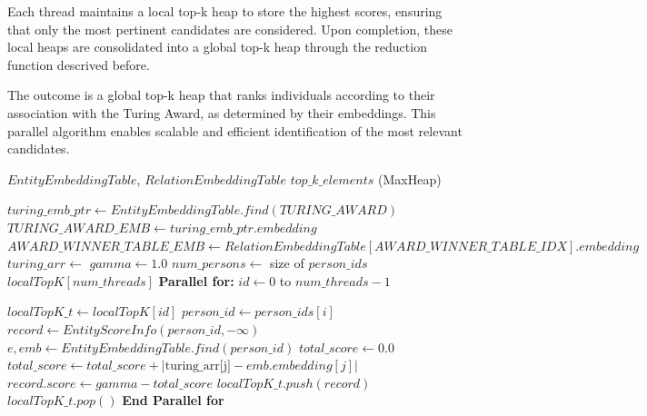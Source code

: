 \documentclass[sigconf]{acmart}
\newcommand{\ParFor}[1]{%
    \textbf{Parallel for:} #1
}
\newcommand{\EndParFor}{%
    \textbf{End Parallel for}
}
\begin{document}
Each thread maintains a local top-k heap to store the highest scores, ensuring that only the most pertinent candidates are considered. Upon completion, these local heaps are consolidated into a global top-k heap through the reduction function descrived before.

The outcome is a global top-k heap that ranks individuals according to their association with the Turing Award, as determined by their embeddings. This parallel algorithm enables scalable and efficient identification of the most relevant candidates.

\begin{algorithm*}
\caption{Compute Top-k Persons related to the Turing Award}
\begin{algorithmic}[1]
\Require $EntityEmbeddingTable$, $RelationEmbeddingTable$
\Ensure $top\_k\_elements$ (MaxHeap)

    \State $turing\_emb\_ptr \gets EntityEmbeddingTable.find(TURING\_AWARD)$
    \State $TURING\_AWARD\_EMB \gets turing\_emb\_ptr.embedding$
    \State $AWARD\_WINNER\_TABLE\_EMB \gets RelationEmbeddingTable[AWARD\_WINNER\_TABLE\_IDX].embedding$
    \State $turing\_arr \gets$ 
    \State $gamma \gets 1.0$
    \State $num\_persons \gets$ size of $person\_ids$
    \State $localTopK[num\_threads]$ 
    \ParFor{$id \gets 0$ to $num\_threads - 1$}
        \State $localTopK\_t \gets localTopK[id]$
            \State $person\_id \gets person\_ids[i]$
            \State $record \gets EntityScoreInfo(person\_id, -\infty)$
            \State $e, emb \gets EntityEmbeddingTable.find(person\_id)$
                \State $total\_score \gets 0.0$
                    \State $total\_score \gets total\_score + |\text{turing\_arr[j]} - emb.embedding[j]|$
                \EndFor
                \State $record.score \gets gamma - total\_score$
            \EndIf
            \State $localTopK\_t.push(record)$
                \State $localTopK\_t.pop()$
            \EndIf
        \EndFor
        \State {}
    \EndParFor
\EndFunction
\end{algorithmic}
\label{algo:computeScorePerPerson}
\end{algorithm*}
\end{document}
